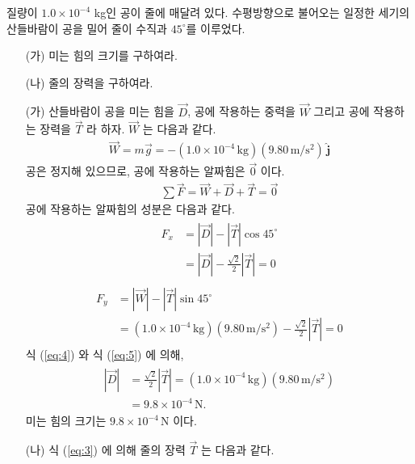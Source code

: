 \documentclass[floatfix,nofootinbib,superscriptaddress,fleqn,preprint]{revtex4}
\begin{document}
질량이 $1.0\times 10^{-4}$ kg인 공이 줄에 매달려 있다. 수평방향으로
불어오는 일정한 세기의 산들바람이 공을 밀어 줄이 수직과 $45^\circ$를
이루었다.
\begin{itemize}
\item[(가)] 미는 힘의 크기를 구하여라.
\item[(나)] 줄의 장력을 구하여라.
\end{itemize}

\begin{itemize}
  \item[(가)]
  산들바람이 공을 미는 힘을 $\vec{D}$, 공에 작용하는 중력을
  $\vec{W}$ 그리고 공에 작용하는 장력을 $\vec{T}$ 라 하자.
  $\vec{W}$ 는 다음과 같다.
  \begin{align}
    \vec{W} = m\vec{g} 
    = -(1.0\times 10^{-4}\,\mathrm{kg})(9.80\,\mathrm{m/s^2})\,\hat{\bm{j}}
  \end{align}
  공은 정지해 있으므로, 공에 작용하는 알짜힘은 $\vec{0}$ 이다.
  \begin{align}\label{eq:3}
    \sum\vec{F}=\vec{W}+\vec{D}+\vec{T} = \vec{0}
  \end{align}
공에 작용하는 알짜힘의 성분은 다음과 같다.
\begin{align}\label{eq:4}
  \begin{split}
    F_x &= |\vec{D}|-|\vec{T}|\cos{45^{\circ}} \\
    &= |\vec{D}|-\frac{\sqrt{2}}{2}|\vec{T}|
    = 0   
  \end{split}
\end{align}
\begin{align}\label{eq:5}
  \begin{split}
    F_y &= |\vec{W}|-|\vec{T}|\sin{45^{\circ}}  \\
    &= (1.0\times 10^{-4}\,\mathrm{kg})(9.80\,\mathrm{m/s^2})
    -\frac{\sqrt{2}}{2}|\vec{T}|
    = 0
  \end{split}
\end{align}
식 (\ref{eq:4}) 와 식 (\ref{eq:5}) 에 의해,
\begin{align}
  \begin{split}
    |\vec{D}| &= \frac{\sqrt{2}}{2}|\vec{T}|
    = (1.0\times 10^{-4}\,\mathrm{kg})(9.80\,\mathrm{m/s^2})  \\
    &=9.8\times 10^{-4}\,\mathrm{N}.
  \end{split}
\end{align}
미는 힘의 크기는 $9.8\times 10^{-4}\,\mathrm{N}$ 이다.
\item[(나)] 식 (\ref{eq:3}) 에 의해 줄의 장력 $\vec{T}$ 는 다음과 같다.

\end{itemize}
\end{document}
